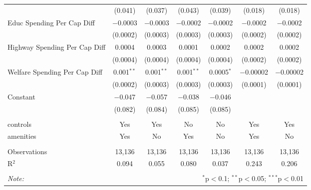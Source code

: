 \begin{table}[!htbp]
\begin{tabular}{@{\extracolsep{5pt}}lcccccc}
  & (0.041) & (0.037) & (0.043) & (0.039) & (0.018) & (0.018) \\ 
  Educ Spending Per Cap Diff & $-$0.0003 & $-$0.0003 & $-$0.0002 & $-$0.0002 & $-$0.0002 & $-$0.0002 \\ 
  & (0.0002) & (0.0003) & (0.0003) & (0.0003) & (0.0002) & (0.0002) \\ 
  Highway Spending Per Cap Diff & 0.0004 & 0.0003 & 0.0001 & 0.0002 & 0.0002 & 0.0002 \\ 
  & (0.0004) & (0.0004) & (0.0004) & (0.0004) & (0.0002) & (0.0002) \\ 
  Welfare Spending Per Cap Diff & 0.001$^{**}$ & 0.001$^{**}$ & 0.001$^{**}$ & 0.0005$^{*}$ & $-$0.00002 & $-$0.00002 \\ 
  & (0.0002) & (0.0003) & (0.0003) & (0.0003) & (0.0001) & (0.0001) \\ 
  Constant & $-$0.047 & $-$0.057 & $-$0.038 & $-$0.046 &  &  \\ 
  & (0.082) & (0.084) & (0.085) & (0.085) &  &  \\ 
 \hline \\[-1.8ex] 
controls & Yes & Yes & No & No & Yes & Yes \\ 
amenities & Yes & No & Yes & No & Yes & No \\ 
\hline \\[-1.8ex] 
Observations & 13,136 & 13,136 & 13,136 & 13,136 & 13,136 & 13,136 \\ 
R$^{2}$ & 0.094 & 0.055 & 0.080 & 0.037 & 0.243 & 0.206 \\ 
\hline 
\hline \\[-1.8ex] 
\textit{Note:}  & \multicolumn{6}{r}{$^{*}$p$<$0.1; $^{**}$p$<$0.05; $^{***}$p$<$0.01} \\ 
\end{tabular} 
\end{table} 
